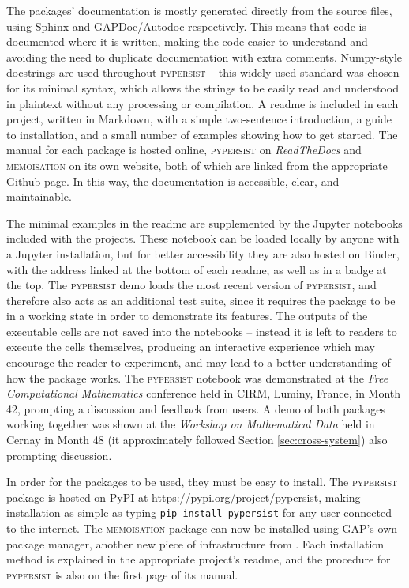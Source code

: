 \documentclass{deliverablereport}
\newcommand{\pypersist}{\textsc{pypersist}}
\newcommand{\Memoisation}{\textsc{memoisation}}
\begin{document}
The packages' documentation is mostly generated directly from the source files,
using Sphinx and GAPDoc/Autodoc respectively.
This means that code is documented where it is written,
making the code easier to understand and avoiding the need to duplicate
documentation with extra comments.  Numpy-style docstrings are used throughout \pypersist{}
-- this widely used standard was chosen for its minimal syntax, which allows the
strings to be easily read and understood in plaintext without any processing or
compilation.  A readme is included in each project, written in Markdown, with a simple
two-sentence introduction, a guide to installation, and a small number of examples
showing how to get started.  The manual for each package is hosted online,
\pypersist{} on \textit{ReadTheDocs} and \Memoisation{} on its own website, both
of which are linked from the appropriate Github page.  In this way, the
documentation is accessible, clear, and
maintainable.

The minimal examples in the readme are supplemented by the Jupyter notebooks
included with the projects.
These notebook can be loaded locally by anyone with a Jupyter installation, but
for better accessibility they are also hosted on Binder, with the address linked at
the bottom of each readme, as well as in a badge at the top.  The \pypersist{} demo loads the
most recent version of \pypersist{}, and therefore also acts as an additional
test suite, since it requires the package to be in a working state in order to
demonstrate its features.  The outputs of the executable cells are not saved
into the notebooks -- instead it is left to readers to execute the cells
themselves, producing an interactive experience which may encourage the reader to
experiment, and may lead to a better understanding of how the package works.
The \pypersist{} notebook was demonstrated at the \emph{Free Computational Mathematics}
conference held in CIRM, Luminy, France, in Month 42, prompting a
discussion and feedback from users.  A demo of both packages working together
was shown at the \textit{Workshop on Mathematical Data} held in Cernay
in Month 48 (it approximately followed Section \ref{sec:cross-system}) also
prompting discussion.

In order for the packages to be used, they must be easy to install.  The
\pypersist{} package is hosted on PyPI at
\url{https://pypi.org/project/pypersist}, making installation as simple as
typing \texttt{pip install pypersist} for any user connected to the internet.
The \Memoisation{} package can now be installed using GAP's own package manager,
another new piece of \GAP infrastructure from \ODK.  Each installation method is
explained in the appropriate project's readme, and the procedure for
\pypersist{} is also on the first page of its manual.
\end{document}
